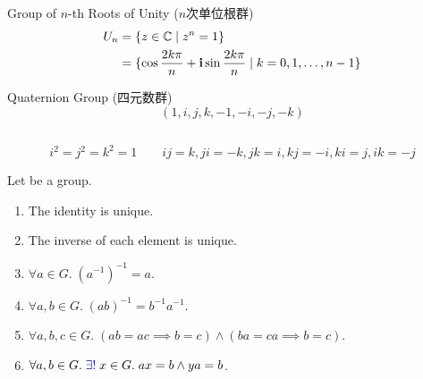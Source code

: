 \begin{frame}
  \begin{exampleblock}{Group of $n$-th Roots of Unity ($n$次单位根群)}
    \begin{align*}
      U_{n} &= \{z \in \mathbb{C} \mid z^{n} = 1\} \\
            &= \{\cos \frac{2k\pi}{n} + \text{\bf i} \sin \frac{2k\pi}{n} \mid k = 0, 1, \dots, n-1\}
    \end{align*}
  \end{exampleblock}

  \pause
\end{frame}

\begin{frame}
  \begin{exampleblock}{Quaternion Group (四元数群)}
    \[
      (1, i, j, k, -1, -i, -j, -k)
    \]
    \begin{columns}
        \begin{center}
        \end{center}
    \end{columns}
    \[
      i^2 = j^2 = k^2 = 1 \qquad ij = k, ji = -k, jk = i, kj = -i, ki = j, ik = -j
    \]
  \end{exampleblock}
\end{frame}

\begin{frame}
  \begin{theorem}
    Let  be a group.
    \begin{enumerate}[<+->][(1)]
      \setlength{\itemsep}{8pt}
      \item The identity is unique.
      \item The inverse of each element is unique.
      \item $\forall a \in G.\; (a^{-1})^{-1} = a$.
      \item $\forall a, b \in G.\; (ab)^{-1} = b^{-1}a^{-1}$.
      \item $\forall a, b, c \in G.\; (ab = ac \implies b = c) \land (ba = ca \implies b = c)$.
      \item $\forall a, b \in G.\; \textcolor{blue}{\exists!}\; x \in G.\; ax = b \land ya = b$.
    \end{enumerate}
  \end{theorem}
\end{frame}

